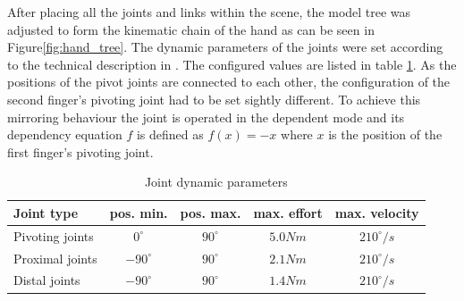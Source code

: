 After placing all the joints and links within the scene, the model tree was adjusted to form the kinematic chain of the hand as can be seen in Figure\ref{fig:hand_tree}. The dynamic parameters of the joints were set according to the technical description in \citep{schunk2010}. The configured values are listed in table \ref{tbl:tech_data}. As the positions of the pivot joints are connected to each other, the configuration of the second finger's pivoting joint had to be set sightly different. To achieve this mirroring behaviour the joint is operated in the dependent mode and its dependency equation $f$ is defined as $f(x) = -x$ where $x$ is the position of the first finger's pivoting joint.
\begin{table}[h]
  \centering
  \begin{tabular}[h]{|l|c|c|c|c|} \hline
	\textbf{Joint type} & \textbf{pos. min.} & \textbf{pos. max.} & \textbf{max. effort} & \textbf{max. velocity} \\ \hline
	Pivoting joints & $0^{\circ}$ & $90^{\circ}$ & $5.0 Nm$ & $210^{\circ}/s$ \\
	Proximal joints & $-90^{\circ}$ & $90^{\circ}$ & $2.1 Nm$ & $210^{\circ}/s$ \\
	Distal joints & $-90^{\circ}$ & $90^{\circ}$ & $1.4 Nm$ & $210^{\circ}/s$ \\ \hline
  \end{tabular}
  \caption{Joint dynamic parameters}
  \label{tbl:tech_data}
\end{table} \\

